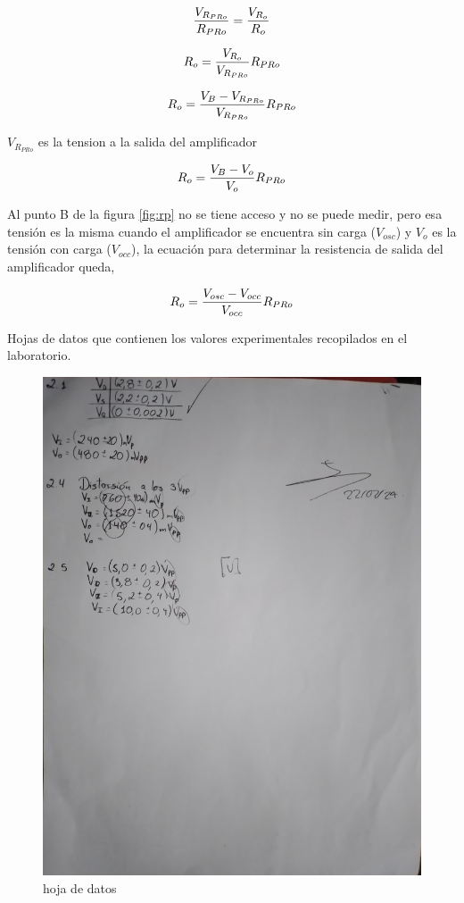 \documentclass[12pt, a4paper]{article}
\begin{document}
    $${V_{R_{PRo}} \over R_{PRo}} = {V_{R_o} \over R_o}$$

    $$R_o = {V_{R_o} \over V_{R_{PRo}}}R_{PRo}$$

    $$R_o = {V_B - V_{R_{PRo}} \over V_{R_{PRo}}}R_{PRo}$$

    $V_{R_{PRo}}$ es la tension a la salida del amplificador

    $$R_o = {V_B - V_o \over V_o}R_{PRo}$$

    Al punto B de la figura \ref{fig:rp} no se tiene acceso y no se puede medir, pero esa tensión es la misma cuando el amplificador se encuentra sin carga ($V_{osc}$) y $V_o$ es la tensión con carga ($V_{occ}$), la ecuación para determinar la resistencia de salida del amplificador queda,

    \begin{equation} \label{eqro}
        R_o = {V_{osc} - V_{occ} \over V_{occ}}R_{PRo}
    \end{equation}

    \newpage

    Hojas de datos que contienen los valores experimentales recopilados en el laboratorio.

    \begin{figure}[h!]
        \centering
        \includegraphics[height=15cm\textwidth]{hd6.jpg}
        \caption{hoja de datos}
        \label{fig:hd6}
    \end{figure}
\end{document}
